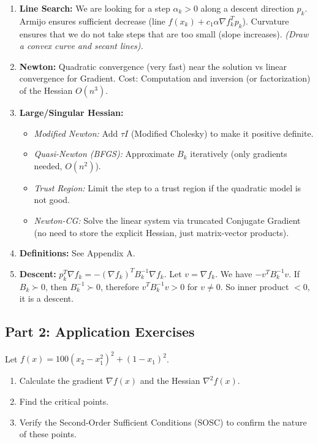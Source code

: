 \begin{correction}
\begin{enumerate}
    \item \textbf{Line Search:} We are looking for a step $\alpha_k > 0$ along a descent direction $p_k$. Armijo ensures sufficient decrease (line $f(x_k) + c_1 \alpha \nabla f_k^T p_k$). Curvature ensures that we do not take steps that are too small (slope increases). \textit{(Draw a convex curve and secant lines).}
    \item \textbf{Newton:} Quadratic convergence (very fast) near the solution vs linear convergence for Gradient. Cost: Computation and inversion (or factorization) of the Hessian $O(n^3)$.
    \item \textbf{Large/Singular Hessian:}
    \begin{itemize}
        \item \textit{Modified Newton:} Add $\tau I$ (Modified Cholesky) to make it positive definite.
        \item \textit{Quasi-Newton (BFGS):} Approximate $B_k$ iteratively (only gradients needed, $O(n^2)$).
        \item \textit{Trust Region:} Limit the step to a trust region if the quadratic model is not good.
        \item \textit{Newton-CG:} Solve the linear system via truncated Conjugate Gradient (no need to store the explicit Hessian, just matrix-vector products).
    \end{itemize}
    \item \textbf{Definitions:} See Appendix A.
    \item \textbf{Descent:} $p_k^T \nabla f_k = - (\nabla f_k)^T B_k^{-1} \nabla f_k$. Let $v = \nabla f_k$. We have $- v^T B_k^{-1} v$. If $B_k \succ 0$, then $B_k^{-1} \succ 0$, therefore $v^T B_k^{-1} v > 0$ for $v \ne 0$. So inner product $< 0$, it is a descent.
\end{enumerate}
\end{correction}
\bigskip

\subsection*{Part 2: Application Exercises}

\bigskip
\begin{exercice}
Let $f(x) = 100(x_2 - x_1^2)^2 + (1 - x_1)^2$.
\begin{enumerate}
    \item Calculate the gradient $\nabla f(x)$ and the Hessian $\nabla^2 f(x)$.
    \item Find the critical points.
    \item Verify the Second-Order Sufficient Conditions (SOSC) to confirm the nature of these points.
\end{enumerate}
\end{exercice}

